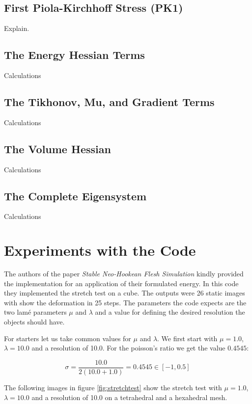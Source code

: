 \subsection{First Piola-Kirchhoff Stress (PK1)}
Explain.

\subsection{The Energy Hessian Terms}
Calculations

\subsection{The Tikhonov, Mu, and Gradient Terms}
Calculations

\subsection{The Volume Hessian}
Calculations
 
\subsection{The Complete Eigensystem}
Calculations

\section{Experiments with the Code}
The authors of the paper \textit{Stable Neo-Hookean Flesh Simulation} \cite{Smith:2018:SNF:3191713.3180491} kindly provided the implementation for an application of their formulated energy. In this code they implemented the stretch test on a cube. The outputs were 26 static images with show the deformation in 25 steps. The parameters the code expects are the two lamé parameters $\mu$ and $\lambda$ and a value for defining the desired resolution the objects should have.


For starters let us take common values for $\mu$ and $\lambda$. We first start with $\mu = 1.0$, $\lambda = 10.0$ and a resolution of 10.0. For the poisson's ratio we get the value $0.4545$:

\[ \sigma =  \frac{10.0}{2 (10.0 + 1.0)} = 0.4545 \in [-1, 0.5] \]


The following images in figure \ref{fig:stretchtest} show the stretch test with $\mu = 1.0$, $\lambda = 10.0$ and a resolution of 10.0 on a tetrahedral and a hexahedral mesh.

